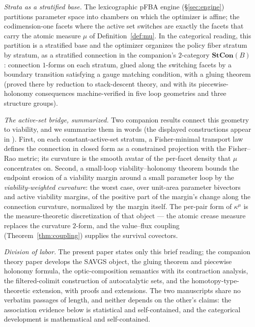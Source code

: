 \documentclass[11pt,a4paper]{article}
\theoremstyle{plain}
\theoremstyle{definition}
\theoremstyle{remark}
\newcommand{\kmu}{\kappa^{\mu}}
\begin{document}
\emph{Strata as a stratified base.} The lexicographic pFBA engine
(\S\ref{sec:engine}) partitions parameter space into chambers on
which the optimizer is affine; the codimension-one facets where the
active set switches are exactly the facets that carry the atomic
measure $\mu$ of Definition~\ref{def:mu}. In the categorical reading,
this partition is a stratified base and the optimizer organizes the
policy fiber stratum by stratum, as a stratified connection in the
companion's $2$-category $\mathbf{StCon}(B)$: connection $1$-forms on
each stratum, glued along the switching facets by a boundary
transition satisfying a gauge matching condition, with a gluing
theorem (proved there by reduction to stack-descent theory, and with
its piecewise-holonomy consequences machine-verified in five loop
geometries and three structure groups).

\emph{The active-set bridge, summarized.} Two companion results
connect this geometry to viability, and we summarize them in words
(the displayed constructions appear in
\citep{zai2026categorical}). First, on each constant-active-set
stratum, a Fisher-minimal transport law defines the connection in
closed form as a constrained projection with the Fisher--Rao metric;
its curvature is the smooth avatar of the per-facet density that
$\mu$ concentrates on. Second, a small-loop viability--holonomy
theorem bounds the endpoint erosion of a viability margin around a
small parameter loop by the \emph{viability-weighted curvature}:
the worst case, over unit-area parameter bivectors and active
viability margins, of the positive part of the margin's change along
the connection curvature, normalized by the margin itself. The
per-pair form of $\kmu$ is the measure-theoretic discretization of
that object --- the atomic crease measure replaces the curvature
$2$-form, and the value--flux coupling
(Theorem~\ref{thm:coupling}) supplies the survival covectors.

\emph{Division of labor.} The present paper states only this brief
reading; the companion theory paper develops the SAVGS object, the
gluing theorem and piecewise holonomy formula, the
optic-composition semantics with its contraction analysis, the
filtered-colimit construction of autocatalytic sets, and the
homotopy-type-theoretic extension, with proofs and extensions. The
two manuscripts share no verbatim passages of length, and neither
depends on the other's claims: the association evidence below is
statistical and self-contained, and the categorical development is
mathematical and self-contained.
\end{document}
